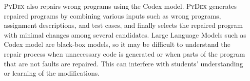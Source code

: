 \documentclass[10pt,conference]{IEEEtran}
\begin{document}
        \textsc{PyDex} \cite{zhang2024pydex} also repairs wrong programs using the Codex model. \textsc{PyDex} generates repaired programs by combining various inputs such as wrong programs, assignment descriptions, and test cases, and finally selects the repaired program with minimal changes among several candidates. Large Language Models such as Codex model are black-box models, so it may be difficult to understand the repair process when unnecessary code is generated or when parts of the program that are not faults are repaired. This can interfere with students' understanding or learning of the modifications.
    
    
        
\end{document}

